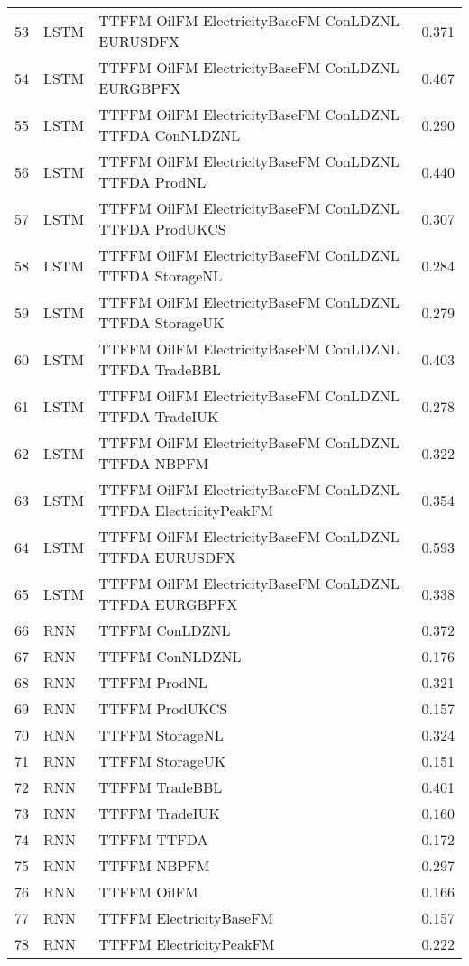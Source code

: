 \begin{table}[ht]
\begin{tabular}{rllr}
  53 & LSTM & TTFFM OilFM ElectricityBaseFM ConLDZNL EURUSDFX & 0.371 \\ 
  54 & LSTM & TTFFM OilFM ElectricityBaseFM ConLDZNL EURGBPFX & 0.467 \\ 
  55 & LSTM & TTFFM OilFM ElectricityBaseFM ConLDZNL TTFDA ConNLDZNL & 0.290 \\ 
  56 & LSTM & TTFFM OilFM ElectricityBaseFM ConLDZNL TTFDA ProdNL & 0.440 \\ 
  57 & LSTM & TTFFM OilFM ElectricityBaseFM ConLDZNL TTFDA ProdUKCS & 0.307 \\ 
  58 & LSTM & TTFFM OilFM ElectricityBaseFM ConLDZNL TTFDA StorageNL & 0.284 \\ 
  59 & LSTM & TTFFM OilFM ElectricityBaseFM ConLDZNL TTFDA StorageUK & 0.279 \\ 
  60 & LSTM & TTFFM OilFM ElectricityBaseFM ConLDZNL TTFDA TradeBBL & 0.403 \\ 
  61 & LSTM & TTFFM OilFM ElectricityBaseFM ConLDZNL TTFDA TradeIUK & 0.278 \\ 
  62 & LSTM & TTFFM OilFM ElectricityBaseFM ConLDZNL TTFDA NBPFM & 0.322 \\ 
  63 & LSTM & TTFFM OilFM ElectricityBaseFM ConLDZNL TTFDA ElectricityPeakFM & 0.354 \\ 
  64 & LSTM & TTFFM OilFM ElectricityBaseFM ConLDZNL TTFDA EURUSDFX & 0.593 \\ 
  65 & LSTM & TTFFM OilFM ElectricityBaseFM ConLDZNL TTFDA EURGBPFX & 0.338 \\ 
  66 & RNN & TTFFM ConLDZNL & 0.372 \\ 
  67 & RNN & TTFFM ConNLDZNL & 0.176 \\ 
  68 & RNN & TTFFM ProdNL & 0.321 \\ 
  69 & RNN & TTFFM ProdUKCS & 0.157 \\ 
  70 & RNN & TTFFM StorageNL & 0.324 \\ 
  71 & RNN & TTFFM StorageUK & 0.151 \\ 
  72 & RNN & TTFFM TradeBBL & 0.401 \\ 
  73 & RNN & TTFFM TradeIUK & 0.160 \\ 
  74 & RNN & TTFFM TTFDA & 0.172 \\ 
  75 & RNN & TTFFM NBPFM & 0.297 \\ 
  76 & RNN & TTFFM OilFM & 0.166 \\ 
  77 & RNN & TTFFM ElectricityBaseFM & 0.157 \\ 
  78 & RNN & TTFFM ElectricityPeakFM & 0.222 \\ 

\end{tabular}
\end{table}
